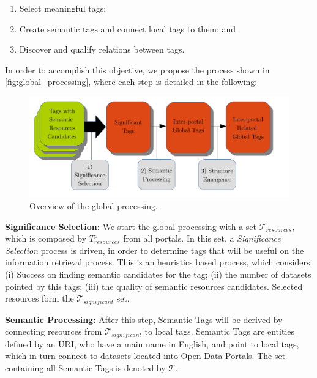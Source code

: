 \begin{enumerate}
	\item Select meaningful tags;
	\item Create semantic tags and connect local tags to them; and
	\item Discover and qualify relations between tags.
\end{enumerate}

In order to accomplish this objective, we propose the process shown in \autoref{fig:global_processing}, where each step is detailed in the following:

\begin{figure}[t]
\begin{center}
\includegraphics[width=\columnwidth]{images/global_processing.pdf}
\caption[Overview of the global processing.]{Overview of the global processing.}
\label{fig:global_processing}
\end{center}
\end{figure}

\noindent \textbf{Significance Selection: } We start the global processing with a set $\mathcal{T}_{resources}$, which is composed by $T^p_{resources}$ from all portals. 
In this set, a \emph{Significance Selection} process is driven, in order to determine tags that will be useful on the information retrieval process.
This is an heuristics based process, which considers: (i) Success on finding semantic candidates for the tag; (ii) the number of datasets pointed by this tags; (iii) the quality of semantic resources candidates.
Selected resources form the $\mathcal{T}_{significant}$ set.

\noindent \textbf{Semantic Processing:} After this step, Semantic Tags will be derived by connecting resources from $\mathcal{T}_{significant}$ to local tags.
Semantic Tags are entities defined by an URI, who have a main name in English, and point to local tags, which in turn connect to datasets located into Open Data Portals.
The set containing all Semantic Tags is denoted by $\mathcal{T}$.

